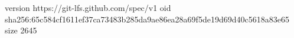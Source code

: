 version https://git-lfs.github.com/spec/v1
oid sha256:65c584cf1611ef37ca73483b285da9ae86ea28a69f5de19d69d40c5618a83e65
size 2645
